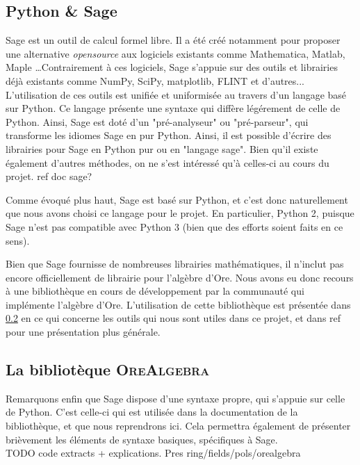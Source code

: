 \documentclass[12pt]{article}
\begin{document}
    \subsection{Python \& Sage}
        \label{sec:sage}
        \par Sage est un outil de calcul formel libre.
        Il a été créé notamment pour proposer
        une alternative \textit{opensource} aux logiciels existants comme Mathematica,
        Matlab, Maple \ldots Contrairement à ces logiciels, Sage s'appuie sur des outils
        et librairies déjà existants comme NumPy, SciPy, matplotlib, FLINT et d'autres...
        L'utilisation de ces outils est unifiée et uniformisée au travers d'un langage
        basé sur Python. Ce langage présente une syntaxe qui diffère légérement de celle
        de Python. Ainsi, Sage est doté d'un "pré-analyseur" ou "pré-parseur",
        qui transforme les idiomes Sage en pur Python.
        Ainsi, il est possible d'écrire des librairies pour Sage en Python pur ou en 
        "langage sage".
        Bien qu'il existe également d'autres méthodes, on ne s'est intéressé qu'à celles-ci au
        cours du projet. {\color{red} ref doc sage?}
        \par Comme évoqué plus haut, Sage est basé sur Python, et c'est donc naturellement
        que nous avons choisi ce langage pour le projet.
        En particulier, Python 2, puisque Sage n'est pas compatible avec Python 3
        (bien que des efforts soient faits en ce sens).
        \par Bien que Sage fournisse de nombreuses librairies mathématiques,
        il n'inclut pas encore officiellement de librairie pour l'algèbre d'Ore.
        Nous avons eu donc recours à une bibliothèque en cours de développement par
        la communauté qui implémente l'algèbre d'Ore. L'utilisation de cette bibliothèque
        est présentée dans \ref{sec:libore} en ce qui concerne les outils qui nous sont utiles dans
        ce projet, et dans {\color{red} ref} pour une présentation plus générale.
    \subsection{La bibliotèque \textsc{OreAlgebra}}
        \label{sec:libore}
        \par Remarquons enfin que Sage dispose d'une syntaxe propre, qui s'appuie sur celle de Python.
        C'est celle-ci qui est utilisée dans la documentation de la bibliothèque, et que nous
        reprendrons ici. Cela permettra également de présenter brièvement les éléments de syntaxe
        basiques, spécifiques à Sage.\\
        {\color{red} TODO code extracts + explications. Pres ring/fields/pols/orealgebra}
\end{document}
